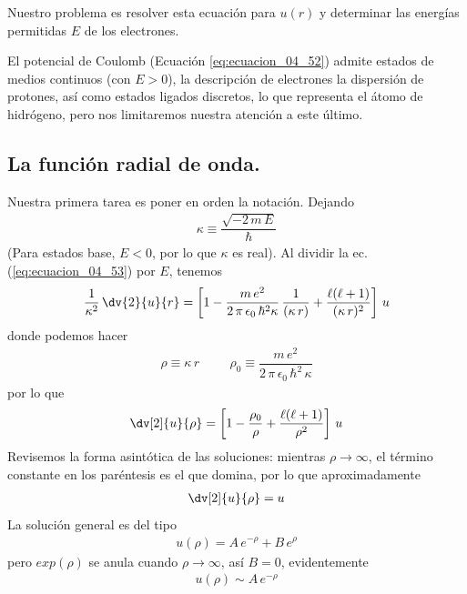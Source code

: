 Nuestro problema es resolver esta ecuación para $u(r)$ y determinar las energías permitidas $E$ de los electrones. 
\par
El potencial de Coulomb (Ecuación \ref{eq:ecuacion_04_52}) admite estados de medios continuos (con $E > 0$), la descripción de electrones la dispersión de protones, así como estados ligados discretos, lo que representa el átomo de hidrógeno, pero nos limitaremos nuestra atención a este último.
\subsection{La función radial de onda.}
Nuestra primera tarea es poner en orden la notación. Dejando
\begin{align}
\kappa \equiv \dfrac{\sqrt{-2 \, m \, E}}{\hbar}
\label{eq:ecuacion_04_54}
\end{align}
(Para estados base, $E < 0$, por lo que $\kappa$ es real). Al dividir la ec. (\ref{eq:ecuacion_04_53}) por $E$, tenemos
\begin{align*}
\dfrac{1}{\kappa^{2}} \, \dv{2}{u}{r} = \left[1 - \dfrac{m \, e^{2}}{2 \, \pi \, \epsilon_{0} \,\hbar^{2} \kappa} \, \dfrac{1}{(\kappa \, r)} + \dfrac{\ell (\ell + 1)}{(\kappa \, r)^{2}} \right] \, u
\end{align*}
donde podemos hacer
\begin{align}
\rho \equiv \kappa \, r \hspace{1cm} \rho_{0} \equiv \dfrac{m \, e^{2}}{2 \, \pi \, \epsilon_{0} \, \hbar^{2} \, \kappa}
\label{eq:ecuacion_04_55}
\end{align}
por lo que
\begin{align}
\dv[2]{u}{\rho} = \left[ 1 - \dfrac{\rho_{0}}{\rho} + \dfrac{\ell (\ell + 1)}{\rho^{2}} \right] \, u
\label{eq:ecuacion_04_56}
\end{align}
Revisemos la forma asintótica de las soluciones: mientras $\rho \to \infty$, el término constante en los paréntesis es el que domina, por lo que aproximadamente
\begin{align*}
\dv[2]{u}{\rho} = u
\end{align*}
La solución general es del tipo
\begin{align}
u(\rho) = A \, e^{-\rho} + B \, e^{\rho}
\label{eq:ecuacion_04_57}
\end{align}
pero $exp(\rho)$ se anula cuando $\rho \to \infty$, así $B = 0$, evidentemente
\begin{align}
u(\rho) \sim A \, e^{-\rho}
\label{eq:ecuacion_04_58}
\end{align}
